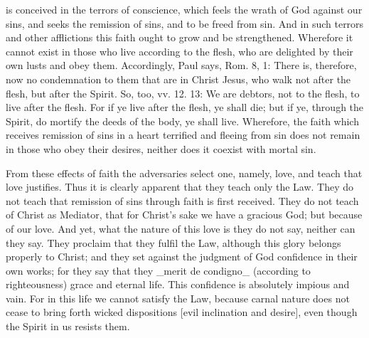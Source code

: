 is conceived in the terrors of conscience, which feels the wrath of
God against our sins, and seeks the remission of sins, and to be
freed from sin.  And in such terrors and other afflictions this faith
ought to grow and be strengthened.  Wherefore it cannot exist in
those who live according to the flesh, who are delighted by their own
lusts and obey them.  Accordingly, Paul says, Rom. 8, 1: There is,
therefore, now no condemnation to them that are in Christ Jesus, who
walk not after the flesh, but after the Spirit.  So, too, vv. 12. 13:
We are debtors, not to the flesh, to live after the flesh.  For if ye
live after the flesh, ye shall die; but if ye, through the Spirit, do
mortify the deeds of the body, ye shall live.  Wherefore, the faith
which receives remission of sins in a heart terrified and fleeing
from sin does not remain in those who obey their desires, neither
does it coexist with mortal sin.

From these effects of faith the adversaries select one, namely, love,
and teach that love justifies.  Thus it is clearly apparent that they
teach only the Law.  They do not teach that remission of sins through
faith is first received.  They do not teach of Christ as Mediator,
that for Christ's sake we have a gracious God; but because of our
love.  And yet, what the nature of this love is they do not say,
neither can they say.  They proclaim that they fulfil the Law,
although this glory belongs properly to Christ; and they set against
the judgment of God confidence in their own works; for they say that
they _merit de condigno_ (according to righteousness) grace and
eternal life.  This confidence is absolutely impious and vain.  For
in this life we cannot satisfy the Law, because carnal nature does
not cease to bring forth wicked dispositions [evil inclination and
desire], even though the Spirit in us resists them.

